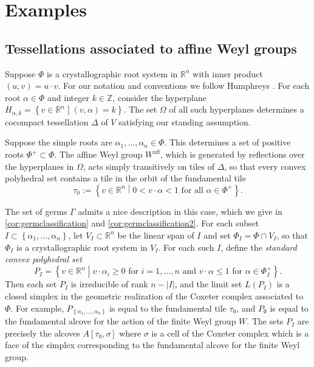 \documentclass[11pt]{amsart}
\def\R{\mathbb{R}}
\def\Z{\mathbb{Z}}
\numberwithin{table}{section}
\numberwithin{figure}{section}
\theoremstyle{remark}
\providecommand{\abs}[1]{\left\lvert#1\right\rvert}
\providecommand{\set}[1]{\left\lbrace#1\right\rbrace}
\newcommand{\Waff}[1][]{\ensuremath{W^{\mathrm{aff}}_{#1}}}
\newcommand\suchthat{ \mathrel{}\middle| \mathrel{}}
\begin{document}
\section{Examples} \label{sec:examples}

\subsection{Tessellations associated to affine Weyl groups}

Suppose $\Phi$ is a crystallographic root system in $\R^n$ with inner product $(u,v) = u\cdot v$. 
For our notation and conventions we follow Humphreys \cite{Hum}.  For each
root $\alpha\in \Phi$ and integer $k\in \Z$, consider the hyperplane
$H_{\alpha, k} = \set{v\in \R^n \suchthat (v,\alpha) = k}$. The set
$\Omega$ of all such hyperplanes determines a cocompact tessellation
$\Delta$ of $V$ satisfying our standing assumption.

Suppose the simple roots are $\alpha_1,\dotsc, \alpha_n \in
\Phi$. This determines a set of positive roots $\Phi^+ \subset
\Phi$. The affine Weyl group $\Waff[]$, which is generated by reflections
over the hyperplanes in $\Omega$, acts simply transitively on tiles of
$\Delta$, so that every convex polyhedral set contains a tile in the
orbit of the fundamental tile
\[
  \tau_0 := \set{v\in \R^n \suchthat 0< v\cdot \alpha < 1\text{ for
      all } \alpha\in \Phi^+}.
\]

The set of germs $\Gamma$ admits a nice description in this case,
which we give in \cref{cor:germclassification} and
\cref{cor:germclassification2}. For each subset
$I\subset \set{\alpha_1,\dotsc, \alpha_n}$, let $V_I \subset \R^n$ be
the linear span of $I$ and set $\Phi_I = \Phi \cap V_I$, so that
$\Phi_I$ is a crystallographic root system in $V_I$. For each such
$I$, define the {\em standard convex polyhedral set}
\[
  P_I = \set{ v\in \R^n \suchthat v\cdot \alpha_i \geq 0 \text{ for }
    i=1,\dotsc, n \text{ and } v\cdot \alpha \leq 1 \text{ for }\alpha\in
    \Phi_I^+ }.
\]
Then each set $P_I$ is irreducible of rank $n-\abs{I}$, and the limit
set $L(P_I)$ is a closed simplex in the geometric realization of the
Coxeter complex associated to $\Phi$. For example,
$P_{\set{\alpha_1,\dotsc, \alpha_n}}$ is equal to the fundamental tile
$\tau_0$, and $P_\emptyset$ is equal to the fundamental alcove for the
action of the finite Weyl group $W$. The sets $P_I$ are precisely the
alcoves $A[\tau_0, \sigma]$ where $\sigma$ is a cell of the Coxeter
complex which is a face of the simplex corresponding to the
fundamental alcove for the finite Weyl group.
\end{document}
